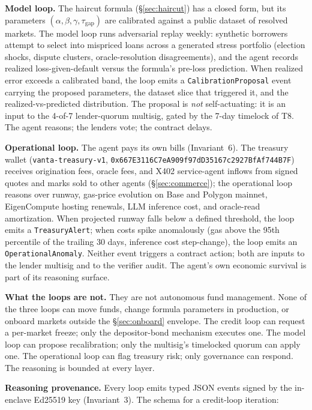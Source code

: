 \documentclass[11pt,letterpaper]{article}
\begin{document}
\textbf{Model loop.} The haircut formula (\S\ref{sec:haircut}) has a closed form, but its parameters $(\alpha, \beta, \gamma, \tau_{\mathrm{gap}})$ are calibrated against a public dataset of resolved markets. The model loop runs adversarial replay weekly: synthetic borrowers attempt to select into mispriced loans across a generated stress portfolio (election shocks, dispute clusters, oracle-resolution disagreements), and the agent records realized loss-given-default versus the formula's pre-loss prediction. When realized error exceeds a calibrated band, the loop emits a \texttt{CalibrationProposal} event carrying the proposed parameters, the dataset slice that triggered it, and the realized-vs-predicted distribution. The proposal is \emph{not} self-actuating: it is an input to the 4-of-7 lender-quorum multisig, gated by the 7-day timelock of T8. The agent reasons; the lenders vote; the contract delays.

\textbf{Operational loop.} The agent pays its own bills (Invariant~6). The treasury wallet (\texttt{vanta-treasury-v1}, \texttt{0x667E3116C7eA909f97dD35167c2927BfAf744B7F}) receives origination fees, oracle fees, and X402 service-agent inflows from signed quotes and marks sold to other agents (\S\ref{sec:commerce}); the operational loop reasons over runway, gas-price evolution on Base and Polygon mainnet, EigenCompute hosting renewals, LLM inference cost, and oracle-read amortization. When projected runway falls below a defined threshold, the loop emits a \texttt{TreasuryAlert}; when costs spike anomalously (gas above the 95th percentile of the trailing 30 days, inference cost step-change), the loop emits an \texttt{OperationalAnomaly}. Neither event triggers a contract action; both are inputs to the lender multisig and to the verifier audit. The agent's own economic survival is part of its reasoning surface.

\textbf{What the loops are not.} They are not autonomous fund management. None of the three loops can move funds, change formula parameters in production, or onboard markets outside the \S\ref{sec:onboard} envelope. The credit loop can request a per-market freeze; only the depositor-bond mechanism executes one. The model loop can propose recalibration; only the multisig's timelocked quorum can apply one. The operational loop can flag treasury risk; only governance can respond. The reasoning is bounded at every layer.

\textbf{Reasoning provenance.} Every loop emits typed JSON events signed by the in-enclave Ed25519 key (Invariant~3). The schema for a credit-loop iteration:
\end{document}
